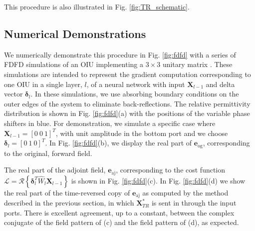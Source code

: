

This procedure is also illustrated in Fig. \ref{fig:TR_schematic}.

\subsection{Numerical Demonstrations}

We numerically demonstrate this procedure in Fig. \ref{fig:fdfd} with a series of FDFD simulations of an OIU implementing a $3 \times 3$ unitary matrix \cite{Reck1994}. These simulations are intended to represent the gradient computation corresponding to one OIU in a single layer, $l$, of a neural network with input $\mathbf{X}_{l-1}$ and delta vector $\boldsymbol{\delta}_l$. In these simulations, we use absorbing boundary conditions on the outer edges of the system to eliminate back-reflections.  The relative permittivity distribution is shown in Fig. \ref{fig:fdfd}(a) with the positions of the variable phase shifters in blue.  For demonstration, we simulate a specific case where $\mathbf{X}_{l-1} = [0~0~1]^T$, with unit amplitude in the bottom port and we choose $\boldsymbol{\delta}_l = [0~1~0]^T$.  In Fig. \ref{fig:fdfd}(b), we display the real part of $\textbf{e}_\textrm{og}$, corresponding to the original, forward field.  

The real part of the adjoint field, $\textbf{e}_\textrm{aj}$, corresponding to the cost function $\mathcal{L} = \mathcal{R}\left\{\boldsymbol{\delta}_l^T \hat{W}_l \mathbf{X}_{l-1} \right\}$ is shown in Fig. \ref{fig:fdfd}(c).  In Fig. \ref{fig:fdfd}(d) we show the real part of the time-reversed copy of $\textbf{e}_\textrm{aj}$ as computed by the method described in the previous section, in which $\mathbf{X}^*_{TR}$ is sent in through the input ports.  There is excellent agreement, up to a constant, between the complex conjugate of the field pattern of (c) and the field pattern of (d), as expected.  

